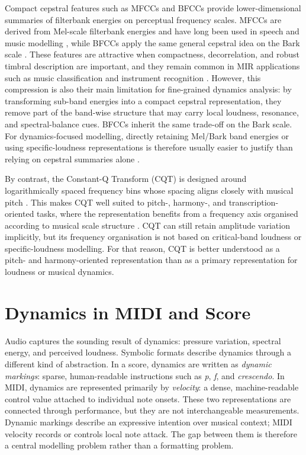 Compact cepstral features such as MFCCs and BFCCs provide lower-dimensional summaries of filterbank energies on perceptual frequency scales. MFCCs are derived from Mel-scale filterbank energies and have long been used in speech and music modelling \cite{davis1980comparison,logan2000mel}, while BFCCs apply the same general cepstral idea on the Bark scale \cite{herrera2010bfcc}. These features are attractive when compactness, decorrelation, and robust timbral description are important, and they remain common in MIR applications such as music classification and instrument recognition \cite{fu2011survey,panda2023audiofeatures,chen2024interpreting}. However, this compression is also their main limitation for fine-grained dynamics analysis: by transforming sub-band energies into a compact cepstral representation, they remove part of the band-wise structure that may carry local loudness, resonance, and spectral-balance cues. BFCCs inherit the same trade-off on the Bark scale. For dynamics-focused modelling, directly retaining Mel/Bark band energies or using specific-loudness representations is therefore usually easier to justify than relying on cepstral summaries alone \cite{mcloughlin2026spectrogramfeatures,narang2024automatic,he2026dynest,kondo2025perceivedvibrato}.

By contrast, the Constant-Q Transform (CQT) is designed around logarithmically spaced frequency bins whose spacing aligns closely with musical pitch \cite{brown1991constantq}. This makes CQT well suited to pitch-, harmony-, and transcription-oriented tasks, where the representation benefits from a frequency axis organised according to musical scale structure \cite{cheuk2020impact,mcloughlin2026spectrogramfeatures}. CQT can still retain amplitude variation implicitly, but its frequency organisation is not based on critical-band loudness or specific-loudness modelling. For that reason, CQT is better understood as a pitch- and harmony-oriented representation than as a primary representation for loudness or musical dynamics. 


\section{Dynamics in MIDI and Score}
\label{sec:bg:dynamics_midi_score}

Audio captures the sounding result of dynamics: pressure variation, spectral energy, and perceived loudness. Symbolic formats describe dynamics through a different kind of abstraction. In a score, dynamics are written as \emph{dynamic markings}: sparse, human-readable instructions such as \textit{p}, \textit{f}, and \textit{crescendo}. In MIDI, dynamics are represented primarily by \emph{velocity}: a dense, machine-readable control value attached to individual note onsets. These two representations are connected through performance, but they are not interchangeable measurements. Dynamic markings describe an expressive intention over musical context; MIDI velocity records or controls local note attack. The gap between them is therefore a central modelling problem rather than a formatting problem.


